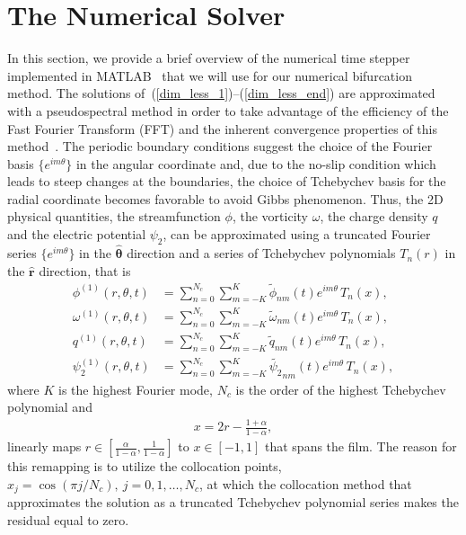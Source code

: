 \section{The Numerical Solver}\label{sec_num_sol}
In this section, we provide a brief overview of the numerical time stepper implemented in MATLAB~\cite{PeiChunTsain} that we will use for our numerical bifurcation method. The solutions of~(\ref{dim_less_1})--(\ref{dim_less_end}) are approximated with a pseudospectral method in order to take advantage of the efficiency of the Fast Fourier Transform (FFT) and the inherent convergence properties of this method~\cite{Trefethen}.
The periodic boundary conditions suggest the choice of the Fourier basis $\{e^{im\theta}\}$ in the angular coordinate and, due to the no-slip condition which leads to steep changes at the boundaries, the choice of Tchebychev basis for the radial coordinate becomes favorable to avoid Gibbs phenomenon. Thus, the 2D physical quantities, the streamfunction $\phi$, the vorticity $\omega$, the charge density $q$ and the electric potential $\psi_2$, can be approximated using a truncated Fourier series $\{e^{im\theta}\}$ in the $\boldsymbol{\hat{\theta}}$ direction and a series of Tchebychev polynomials $T_n(r)$ in the $\hat{\mathbf{r}}$ direction, that is
\begin{subequations}
\begin{align}
\phi^{(1)}(r,\theta,t) &= \sum_{n=0}^{N_c}\sum_{m = -K}^{K}\tilde{\phi}_{nm}(t)e^{im\theta}\,T_n(x),\\
\omega^{(1)}(r,\theta,t) &= \sum_{n=0}^{N_c}\sum_{m = -K}^{K}\tilde{\omega}_{nm}(t)e^{im\theta}\,T_n(x),\\
q^{(1)}(r,\theta,t) &= \sum_{n=0}^{N_c}\sum_{m = -K}^{K}\tilde{q}_{nm}(t)e^{im\theta}\,T_n(x),\\
\psi_2^{(1)}(r,\theta,t) &= \sum_{n=0}^{N_c}\sum_{m = -K}^{K}\tilde{\psi_2}_{nm}(t)e^{im\theta}\,T_n(x),
\end{align}
\end{subequations}
where $K$ is the highest Fourier mode, $N_c$ is the order of the highest Tchebychev polynomial and
\begin{align}
x = 2r - \frac{1+\alpha}{1-\alpha},
\end{align}
linearly maps $r \in \left[\frac{\alpha}{1-\alpha}, \frac{1}{1-\alpha}\right]$ to $x \in [-1,1]$ that spans the film. The reason for this remapping is to utilize the collocation points, $x_j = \cos(\pi j/N_c),\ j = 0,1,\ldots,N_c$, at which the collocation method that approximates the solution as a truncated Tchebychev polynomial series  makes the residual equal to zero.


